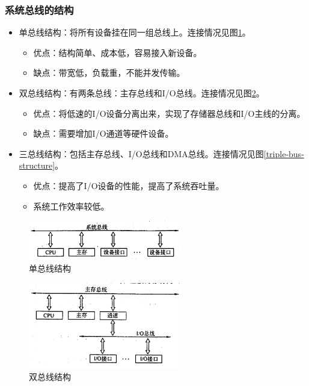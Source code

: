 \documentclass[12pt, a4paper, oneside]{ctexart}
\begin{document}
\subsubsection{系统总线的结构}

\begin{itemize}
  \item 单总线结构：将所有设备挂在同一组总线上。连接情况见图\ref{single-bus-structure}。
  \begin{itemize}
    \item 优点：结构简单、成本低，容易接入新设备。
    \item 缺点：带宽低，负载重，不能并发传输。
  \end{itemize}
  \item 双总线结构：有两条总线：主存总线和I/O总线。连接情况见图\ref{double-bus-structure}。
  \begin{itemize}
    \item 优点：将低速的I/O设备分离出来，实现了存储器总线和I/O主线的分离。
    \item 缺点：需要增加I/O通道等硬件设备。
  \end{itemize}
  \item 三总线结构：包括主存总线、I/O总线和DMA总线。连接情况见图\ref{triple-bus-structure}。
  \begin{itemize}
    \item 优点：提高了I/O设备的性能，提高了系统吞吐量。
    \item 系统工作效率较低。
  \end{itemize}
\end{itemize}

\begin{figure}
  \centering
  \includegraphics[width=0.6\textwidth]{./images/single-bus-structure.png}
  \caption{单总线结构}
  \label{single-bus-structure}
\end{figure}

\begin{figure}
  \centering
  \includegraphics[width=0.6\textwidth]{./images/double-bus-structure.png}
  \caption{双总线结构}
  \label{double-bus-structure}
\end{figure}
\end{document}
